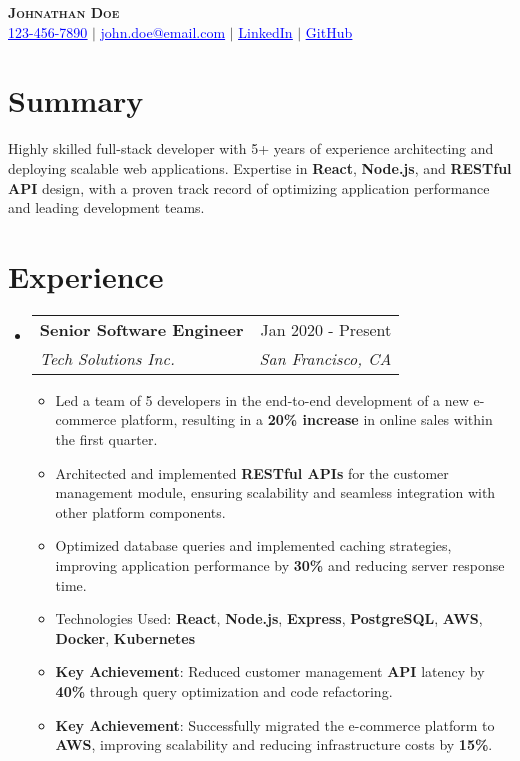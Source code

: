 \documentclass[letterpaper,11pt]{article}
\makeatletter
\newcommand{\resumeItem}[1]{
  \item\small{
    {#1 \vspace{-2pt}}
  }
}
\newcommand{\resumeSubheading}[4]{
  \vspace{-2pt}\item
    \begin{tabular*}{0.97\textwidth}[t]{l@{\extracolsep{\fill}}r}
      \textbf{#1} & #2 \\
      \textit{\small#3} & \textit{\small #4} \\
    \end{tabular*}\vspace{-7pt}
}
\newcommand{\resumeSubHeadingListStart}{\begin{itemize}[leftmargin=0.15in, label={}]}
\newcommand{\resumeSubHeadingListEnd}{\end{itemize}}
\newcommand{\resumeItemListStart}{\begin{itemize}}
\newcommand{\resumeItemListEnd}{\end{itemize}\vspace{-5pt}}
\makeatother
\begin{document}

\begin{center}
    \textbf{\Huge \scshape Johnathan Doe} \\ \vspace{1pt}
    \small \href{tel:123-456-7890}{\textcolor{blue}{\underline{123-456-7890}}} $|$ \href{mailto:john.doe@email.com}{\textcolor{blue}{\underline{john.doe@email.com}}} $|$ 
    \href{https://linkedin.com/in/johndoe}{\textcolor{blue}{\underline{LinkedIn}}} $|$ 
    \href{https://github.com/johndoe}{\textcolor{blue}{\underline{GitHub}}}
\end{center}

\section{Summary}
\small{Highly skilled full-stack developer with 5+ years of experience architecting and deploying scalable web applications. Expertise in \textbf{React}, \textbf{Node.js}, and \textbf{RESTful API} design, with a proven track record of optimizing application performance and leading development teams.}

\section{Experience}
\resumeSubHeadingListStart
    \resumeSubheading
      {Senior Software Engineer}{Jan 2020 - Present}
      {Tech Solutions Inc.}{San Francisco, CA}
      \resumeItemListStart
        \resumeItem{Led a team of 5 developers in the end-to-end development of a new e-commerce platform, resulting in a \textbf{20\% increase} in online sales within the first quarter.}
        \resumeItem{Architected and implemented \textbf{RESTful APIs} for the customer management module, ensuring scalability and seamless integration with other platform components.}
        \resumeItem{Optimized database queries and implemented caching strategies, improving application performance by \textbf{30\%} and reducing server response time.}
        \resumeItem{Technologies Used: \textbf{React}, \textbf{Node.js}, \textbf{Express}, \textbf{PostgreSQL}, \textbf{AWS}, \textbf{Docker}, \textbf{Kubernetes}}
        \resumeItem{\textbf{Key Achievement}: Reduced customer management \textbf{API} latency by \textbf{40\%} through query optimization and code refactoring.}
        \resumeItem{\textbf{Key Achievement}: Successfully migrated the e-commerce platform to \textbf{AWS}, improving scalability and reducing infrastructure costs by \textbf{15\%}.}
      \resumeItemListEnd
\resumeSubHeadingListEnd
\end{document}
